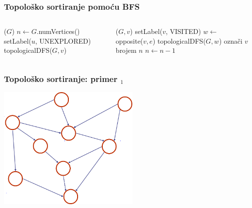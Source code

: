 \documentclass[compress]{beamer}
\begin{document}
\begin{frame}[fragile]
  \frametitle{Topološko sortiranje pomoću BFS}
  {\small
  \begin{columns}
    \begin{column}[t]{6cm}
      \begin{algorithmic}
        \STATE {}($G$)
        \STATE $n \leftarrow G$.numVertices()
          \STATE setLabel($u$, {\scriptsize UNEXPLORED})
        \ENDFOR
            \STATE topologicalDFS($G,v$)
          \ENDIF
        \ENDFOR
      \end{algorithmic}
    \end{column}
    \begin{column}[t]{6cm}
      \begin{algorithmic}
        \STATE {}($G,v$)
        \STATE setLabel($v$, {\scriptsize VISITED})
          \STATE $w \leftarrow$ opposite($v,e$)
            \STATE {}
            \STATE topologicalDFS($G,w$) 
          \ELSE
            \STATE {}
            \STATE označi $v$ brojem $n$ 
          \ENDIF
        \ENDFOR{}
        \STATE $n \leftarrow n-1$
      \end{algorithmic}
    \end{column}
  \end{columns}
  }
\end{frame}

\begin{frame}[fragile]
  \frametitle{Topološko sortiranje: primer $_1$}
  \begin{center}
    \includegraphics[width=7cm]{asp-14-pic48.png}
  \end{center}
\end{frame}
\end{document}
